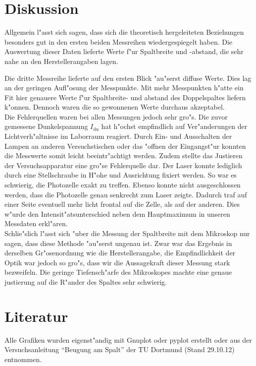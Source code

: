 \section{Diskussion}
	\label{sec:diskussion}

	Allgemein l"asst sich sagen, dass sich die theoretisch hergeleiteten Beziehungen besonders gut in den ersten beiden Messreihen wiedergespiegelt haben.
	Die Auswertung dieser Daten lieferte Werte f"ur Spaltbreite und -abstand, die sehr nahe an den Herstellerangaben lagen.

	Die dritte Messreihe lieferte auf den ersten Blick "au"serst diffuse Werte. Dies lag an der geringen Aufl"osung der Messpunkte.
	Mit mehr Messpunkten h"atte ein Fit hier genauere Werte f"ur Spaltbreite- und abstand des Doppelspaltes liefern k"onnen. Dennoch waren die so gewonnenen Werte durchaus akzeptabel.\\

	Die Fehlerquellen waren bei allen Messungen jedoch sehr gro"s.
	Die zuvor gemessene Dunkelspannung $I_\mathrm{du}$ hat h"ochst empfindlich auf Ver"anderungen der Lichtverh"altnisse im Laborraum reagiert.
	Durch Ein- und Ausschalten der Lampen an anderen Versuchstischen oder das "offnen der Eingangst"ur konnten die Messwerte somit leicht beeintr"achtigt werden.
	Zudem stellte das Justieren der Versuchsapparatur eine gro"se Fehlerquelle dar.
	Der Laser konnte lediglich durch eine Stellschraube in H"ohe und Ausrichtung fixiert werden.
	So war es schwierig, die Photozelle exakt zu treffen.
	Ebenso konnte nicht ausgeschlossen werden, dass die Photozelle genau senkrecht zum Laser zeigte.
	Dadurch traf auf einer Seite eventuell mehr licht frontal auf die Zelle, als auf der anderen.
	Dies w"urde den Intensit"atsunterschied neben dem Hauptmaximum in unseren Messdaten erkl"aren.\\
	
	Schlie"slich l"asst sich "uber die Messung der Spaltbreite mit dem Mikroskop nur sagen, dass diese Methode "au"serst ungenau ist.
	Zwar war das Ergebnis in derselben Gr"osenordnung wie die Herstellerangabe, die Empfindlichkeit der Optik war jedoch so gro"s, dass wir die Aussagekraft dieser Messung stark bezweifeln.
	Die geringe Tiefensch"arfe des Mikroskopes machte eine genaue justierung auf die R"ander des Spaltes sehr schwierig.

\section{Literatur}

	Alle Grafiken wurden eigenst"andig mit Gnuplot oder pyplot erstellt oder aus der Versuchsanleitung "`Beugung am Spalt"' der TU Dortmund (Stand 29.10.12) entnommen.